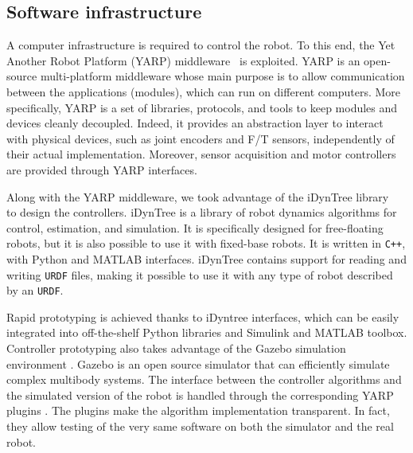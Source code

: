 \subsection{Software infrastructure}
A computer infrastructure is required to control the robot. To
this end, the Yet Another Robot Platform (YARP) middleware~\citep{Metta2006} is exploited. YARP is an open-source multi-platform middleware whose main purpose is to allow communication between the applications (modules), which can run on different computers. More specifically, YARP is a set of libraries, protocols, and tools to keep modules and devices cleanly decoupled. Indeed, it provides an abstraction layer to interact with physical devices, such as joint encoders and F/T sensors, independently of their actual implementation. Moreover, sensor acquisition and motor controllers are provided through YARP interfaces.
\par
Along with the YARP middleware, we took advantage of the iDynTree library~\citep{Nori2015} to design the controllers. iDynTree is a library of robot dynamics algorithms for control, estimation, and simulation. It is specifically designed for free-floating robots, but it is also possible to use it with fixed-base robots. It is written in \texttt{C++}, with Python and MATLAB interfaces. iDynTree contains support for reading and writing \texttt{URDF} files, making it possible to use it with any type of robot described by an \texttt{URDF}.
\par
Rapid prototyping is achieved thanks to iDyntree interfaces, which can be easily integrated into off-the-shelf Python libraries and Simulink and MATLAB toolbox. Controller prototyping also takes advantage of the Gazebo simulation environment \citep{Koenig04}. Gazebo is an open source simulator that can efficiently simulate complex multibody systems. The interface between the controller algorithms and the simulated version of the robot is handled through the corresponding YARP plugins \citep{MingoHoffman2014}. The plugins make the algorithm implementation transparent. In fact, they allow testing of the very same software on both the simulator and the real robot.